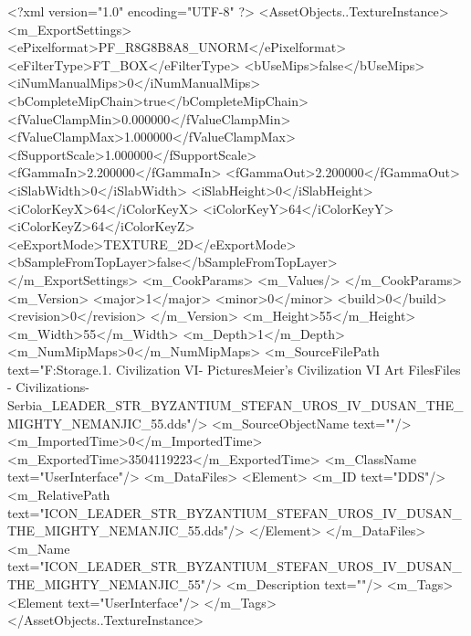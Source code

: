 <?xml version="1.0" encoding="UTF-8" ?>
<AssetObjects..TextureInstance>
	<m_ExportSettings>
		<ePixelformat>PF_R8G8B8A8_UNORM</ePixelformat>
		<eFilterType>FT_BOX</eFilterType>
		<bUseMips>false</bUseMips>
		<iNumManualMips>0</iNumManualMips>
		<bCompleteMipChain>true</bCompleteMipChain>
		<fValueClampMin>0.000000</fValueClampMin>
		<fValueClampMax>1.000000</fValueClampMax>
		<fSupportScale>1.000000</fSupportScale>
		<fGammaIn>2.200000</fGammaIn>
		<fGammaOut>2.200000</fGammaOut>
		<iSlabWidth>0</iSlabWidth>
		<iSlabHeight>0</iSlabHeight>
		<iColorKeyX>64</iColorKeyX>
		<iColorKeyY>64</iColorKeyY>
		<iColorKeyZ>64</iColorKeyZ>
		<eExportMode>TEXTURE_2D</eExportMode>
		<bSampleFromTopLayer>false</bSampleFromTopLayer>
	</m_ExportSettings>
	<m_CookParams>
		<m_Values/>
	</m_CookParams>
	<m_Version>
		<major>1</major>
		<minor>0</minor>
		<build>0</build>
		<revision>0</revision>
	</m_Version>
	<m_Height>55</m_Height>
	<m_Width>55</m_Width>
	<m_Depth>1</m_Depth>
	<m_NumMipMaps>0</m_NumMipMaps>
	<m_SourceFilePath text="F:\Mod Storage\2.1. Civilization VI\Mods\Archive - Pictures\Sid Meier's Civilization VI Art Files\Art Files - Civilizations\Civilization - Serbia\ICON_LEADER_STR_BYZANTIUM_STEFAN_UROS_IV_DUSAN_THE_MIGHTY_NEMANJIC_55.dds"/>
	<m_SourceObjectName text=""/>
	<m_ImportedTime>0</m_ImportedTime>
	<m_ExportedTime>3504119223</m_ExportedTime>
	<m_ClassName text="UserInterface"/>
	<m_DataFiles>
		<Element>
			<m_ID text="DDS"/>
			<m_RelativePath text="ICON_LEADER_STR_BYZANTIUM_STEFAN_UROS_IV_DUSAN_THE_MIGHTY_NEMANJIC_55.dds"/>
		</Element>
	</m_DataFiles>
	<m_Name text="ICON_LEADER_STR_BYZANTIUM_STEFAN_UROS_IV_DUSAN_THE_MIGHTY_NEMANJIC_55"/>
	<m_Description text=""/>
	<m_Tags>
		<Element text="UserInterface"/>
	</m_Tags>
</AssetObjects..TextureInstance>

